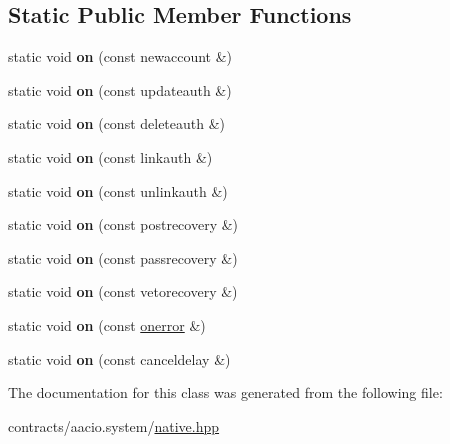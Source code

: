 \subsection*{Static Public Member Functions}
\begin{DoxyCompactItemize}
\item 
\mbox{\label{classaaciosystem_1_1native_aca0432741c693ece0f1202250c4a31fa}} 
static void {\bfseries on} (const newaccount \&)
\item 
\mbox{\label{classaaciosystem_1_1native_a62c8ad3a9a016c91803426680f4ab5b8}} 
static void {\bfseries on} (const updateauth \&)
\item 
\mbox{\label{classaaciosystem_1_1native_a4b020942959b80e7d34090edcf431185}} 
static void {\bfseries on} (const deleteauth \&)
\item 
\mbox{\label{classaaciosystem_1_1native_a91ec64010334d481327b535089ac9e7e}} 
static void {\bfseries on} (const linkauth \&)
\item 
\mbox{\label{classaaciosystem_1_1native_a75dded68021713cb618e4c9b5e238c78}} 
static void {\bfseries on} (const unlinkauth \&)
\item 
\mbox{\label{classaaciosystem_1_1native_a9c22f005f1c948dc29bf63c2cf19f573}} 
static void {\bfseries on} (const postrecovery \&)
\item 
\mbox{\label{classaaciosystem_1_1native_a769bece9d3aa06ffe062247f586047bf}} 
static void {\bfseries on} (const passrecovery \&)
\item 
\mbox{\label{classaaciosystem_1_1native_a7f98aa8a7fcb4db1f6e485752e2e630a}} 
static void {\bfseries on} (const vetorecovery \&)
\item 
\mbox{\label{classaaciosystem_1_1native_a71bd135b964fa05f3f408e8279bf190a}} 
static void {\bfseries on} (const \mbox{\hyperlink{structaaciosystem_1_1native_1_1onerror}{onerror}} \&)
\item 
\mbox{\label{classaaciosystem_1_1native_af377fafa94839b9faa7f6e0b2becc968}} 
static void {\bfseries on} (const canceldelay \&)
\end{DoxyCompactItemize}


The documentation for this class was generated from the following file\+:\begin{DoxyCompactItemize}
\item 
contracts/aacio.\+system/\mbox{\hyperlink{native_8hpp}{native.\+hpp}}\end{DoxyCompactItemize}
